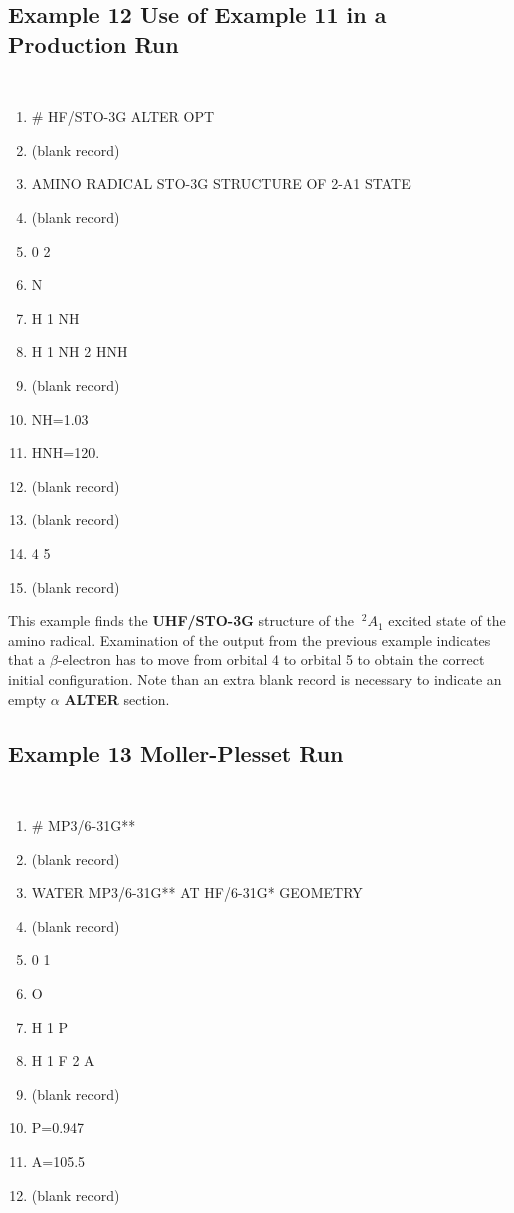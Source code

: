 \subsection{\sf Example 12 Use of Example 11 in a Production Run}
{\tt 
\begin{enumerate}
\item  \# HF/STO-3G ALTER OPT
\item (blank record)
\item  AMINO RADICAL  STO-3G STRUCTURE OF 2-A1 STATE
\item (blank record)
\item  0 2
\item  N
\item  H 1 NH
\item  H 1 NH 2 HNH
\item (blank record)
\item  NH=1.03
\item  HNH=120.
\item (blank record)
\item (blank record)
\item  4 5
\item (blank record)
\end{enumerate}
}
This example finds the {\bf UHF/STO-3G} structure of the $\ ^2A_1$ 
excited state of the
amino radical.  Examination of the output from the previous example indicates
that a $\beta$-electron has to move from orbital 4 to orbital 5 to obtain the
correct initial configuration.  Note than an extra blank record  is
necessary to indicate an empty $\alpha$ {\bf ALTER} section. 
\newpage
\subsection{\sf Example 13 Moller-Plesset Run}
{\tt 
\begin{enumerate}
\item  \# MP3/6-31G**
\item (blank record)
\item  WATER MP3/6-31G** AT HF/6-31G* GEOMETRY
\item (blank record)
\item  0 1
\item  O
\item  H 1 P
\item  H 1 F 2 A
\item (blank record)
\item  P=0.947
\item  A=105.5
\item (blank record)
\end{enumerate}
}
\newpage
